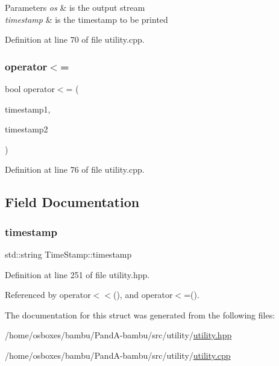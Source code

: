 \begin{DoxyParams}{Parameters}
{\em os} & is the output stream \\
\hline
{\em timestamp} & is the timestamp to be printed \\
\hline
\end{DoxyParams}


Definition at line 70 of file utility.\+cpp.

\mbox{\label{structTimeStamp_aed26d55642f1d3428d843e7997d4983e}} 
\subsubsection{\texorpdfstring{operator$<$=}{operator<=}}
{\footnotesize\ttfamily bool operator$<$= (\begin{DoxyParamCaption}\item[{const \hyperlink{structTimeStamp}{Time\+Stamp} \&}]{timestamp1,  }\item[{const \hyperlink{structTimeStamp}{Time\+Stamp} \&}]{timestamp2 }\end{DoxyParamCaption})\hspace{0.3cm}{\ttfamily [friend]}}



Definition at line 76 of file utility.\+cpp.



\subsection{Field Documentation}
\mbox{\label{structTimeStamp_aabadfe55a07e911a3a255fb59cfff993}} 
\subsubsection{\texorpdfstring{timestamp}{timestamp}}
{\footnotesize\ttfamily std\+::string Time\+Stamp\+::timestamp}



Definition at line 251 of file utility.\+hpp.



Referenced by operator$<$$<$(), and operator$<$=().



The documentation for this struct was generated from the following files\+:\begin{DoxyCompactItemize}
\item 
/home/osboxes/bambu/\+Pand\+A-\/bambu/src/utility/\hyperlink{utility_8hpp}{utility.\+hpp}\item 
/home/osboxes/bambu/\+Pand\+A-\/bambu/src/utility/\hyperlink{utility_8cpp}{utility.\+cpp}\end{DoxyCompactItemize}
